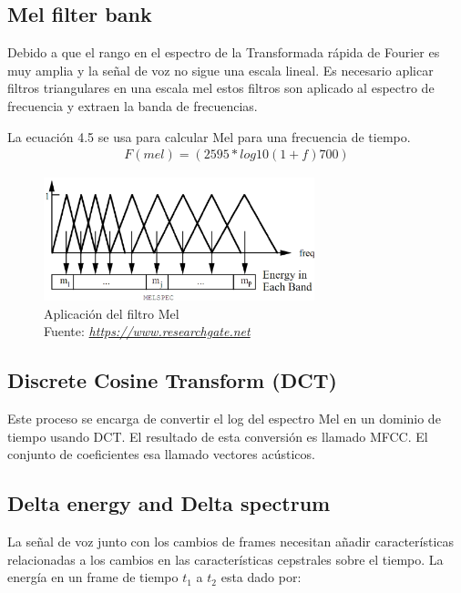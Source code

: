 	\subsection{Mel filter bank}
	Debido a que el rango en el espectro de la Transformada rápida de Fourier es muy amplia y la señal de voz no sigue una escala lineal. Es necesario aplicar filtros triangulares en una escala mel estos filtros son aplicado al espectro de frecuencia y extraen la banda de frecuencias.
	
	La ecuación 4.5 se usa para calcular Mel para una frecuencia de tiempo.
		\begin{equation}
			\label{TFFs}
			\begin{aligned}
			F(mel)=(2595\ast log10(1+f)700)
			\end{aligned}
		\end{equation}	
		
		
		\begin{figure}[H]
			\centering
			\includegraphics[width=0.7\textwidth]{Figures/melfilter.png}
			\caption{Aplicación del filtro Mel \\ Fuente:  \href{https://www.researchgate.net/figure/Mel-Scale-Filter-Bank-14\_fig2\_280027126}{\textit{https://www.researchgate.net}}}
			\label{onda}
		\end{figure} 
	\subsection{Discrete Cosine Transform (DCT)}
	Este proceso se encarga de convertir el log del espectro Mel en un dominio de tiempo usando DCT. El resultado de esta conversión es llamado MFCC. El conjunto de coeficientes esa llamado vectores acústicos.
	\subsection{Delta energy and Delta spectrum}
	La señal de voz junto con los cambios de frames necesitan añadir características relacionadas a los cambios en las características cepstrales sobre el tiempo. La energía en un frame de tiempo $t_{1}$ a $t_{2}$ esta dado por:
	
